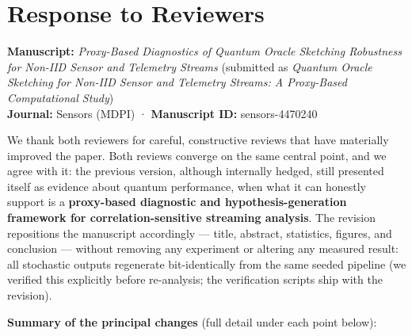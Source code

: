 \documentclass[
  11pt,
]{article}
\author{}
\date{}
\begin{document}
\section{Response to Reviewers}\label{response-to-reviewers}

\textbf{Manuscript:} \emph{Proxy-Based Diagnostics of Quantum Oracle
Sketching Robustness for Non-IID Sensor and Telemetry Streams}
(submitted as \emph{Quantum Oracle Sketching for Non-IID Sensor and
Telemetry Streams: A Proxy-Based Computational Study})\\
\textbf{Journal:} Sensors (MDPI) · \textbf{Manuscript ID:}
sensors-4470240

We thank both reviewers for careful, constructive reviews that have
materially improved the paper. Both reviews converge on the same central
point, and we agree with it: the previous version, although internally
hedged, still presented itself as evidence about quantum performance,
when what it can honestly support is a \textbf{proxy-based diagnostic
and hypothesis-generation framework for correlation-sensitive streaming
analysis}. The revision repositions the manuscript accordingly ---
title, abstract, statistics, figures, and conclusion --- without
removing any experiment or altering any measured result: all stochastic
outputs regenerate bit-identically from the same seeded pipeline (we
verified this explicitly before re-analysis; the verification scripts
ship with the revision).

\textbf{Summary of the principal changes} (full detail under each point
below):
\end{document}
